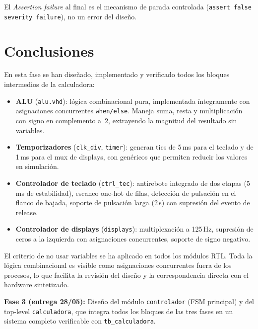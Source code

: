 \documentclass[memoria_final]{subfiles}
\begin{document}
El \textit{Assertion failure} al final es el mecanismo de parada controlada
(\texttt{assert false severity failure}), no un error del diseño.
\FloatBarrier

\section{Conclusiones}

En esta fase se han diseñado, implementado y verificado todos los bloques
intermedios de la calculadora:

\begin{itemize}[leftmargin=1.6cm,itemsep=5pt]
  \item \textbf{ALU} (\texttt{alu.vhd}): lógica combinacional pura,
    implementada íntegramente con asignaciones concurrentes
    \texttt{when/else}. Maneja suma, resta y multiplicación con signo en
    complemento a~2, extrayendo la magnitud del resultado sin variables.

  \item \textbf{Temporizadores} (\texttt{clk\_div}, \texttt{timer}):
    generan tics de 5\,ms para el teclado y de 1\,ms para el mux de
    displays, con genéricos que permiten reducir los valores en simulación.

  \item \textbf{Controlador de teclado} (\texttt{ctrl\_tec}): antirebote
    integrado de dos etapas (5\,ms de estabilidad), escaneo one-hot de filas,
    detección de pulsación en el flanco de bajada, soporte de pulsación larga
    (2\,s) con supresión del evento de release.

  \item \textbf{Controlador de displays} (\texttt{displays}): multiplexación
    a 125\,Hz, supresión de ceros a la izquierda con asignaciones concurrentes,
    soporte de signo negativo.
\end{itemize}

El criterio de no usar variables se ha aplicado en todos los módulos RTL.
Toda la lógica combinacional es visible como asignaciones concurrentes fuera
de los procesos, lo que facilita la revisión del diseño y la correspondencia
directa con el hardware sintetizado.

\vspace{1em}
\begin{tcolorbox}[colback=SoftBlue,colframe=MainBlue,boxrule=0.8pt,arc=2pt,
  left=0.5cm,right=0.5cm,top=0.3cm,bottom=0.3cm]
  \small\faArrowRight\enspace\textbf{Fase 3 (entrega 28/05):}
  Diseño del módulo \texttt{controlador} (FSM principal) y del top-level
  \texttt{calculadora}, que integra todos los bloques de las tres fases en
  un sistema completo verificable con \texttt{tb\_calculadora}.
\end{tcolorbox}
\end{document}
